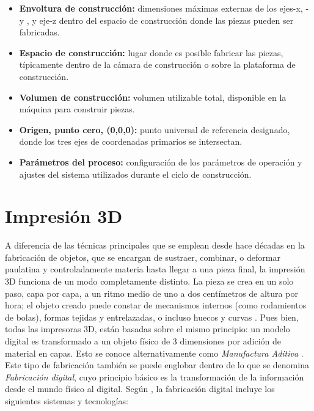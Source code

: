 \begin{itemize}
\item \textbf{Envoltura de construcción:} dimensiones máximas externas de los ejes-x, -y , y eje-z dentro del espacio de construcción donde las piezas pueden ser fabricadas.
\item \textbf{Espacio de construcción:} lugar donde es posible fabricar las piezas, típicamente dentro de la cámara de construcción o sobre la plataforma de construcción.
\item \textbf{Volumen de construcción:} volumen utilizable total, disponible en la máquina para construir piezas.
\item \textbf{Origen, punto cero, (0,0,0):} punto universal de referencia designado, donde los tres ejes de coordenadas primarios se intersectan. 
\item \textbf{Parámetros del proceso:} configuración de los parámetros de operación y ajustes del sistema utilizados durante el ciclo de construcción.
\end{itemize}

\pagebreak

\section{Impresión 3D}

A diferencia de las técnicas principales que se emplean desde hace décadas en la fabricación de objetos, que se encargan de sustraer, combinar, o deformar paulatina y controladamente materia hasta llegar a una pieza final, la impresión 3D funciona de un modo completamente distinto. La pieza se crea en un solo paso, capa por capa, a un ritmo medio de uno a dos centímetros de altura por hora; el objeto creado puede constar de mecanismos internos (como rodamientos de bolas), formas tejidas y entrelazadas, o incluso huecos y curvas \parencite{Berchon2014}. Pues bien, todas las impresoras 3D, están basadas sobre el mismo principio: un modelo digital es transformado a un objeto físico de 3 dimensiones por adición de material en capas. Esto se conoce alternativamente como \textit{Manufactura Aditiva} \parencite{tresdhub2018}. Este tipo de fabricación también se puede englobar dentro de lo que se denomina \textit{Fabricación digital}, cuyo principio básico es la transformación de la información  desde el mundo físico al digital. Según \parencite{jorquera2016}, la fabricación digital incluye los siguientes sistemas y tecnologías:\\
 
